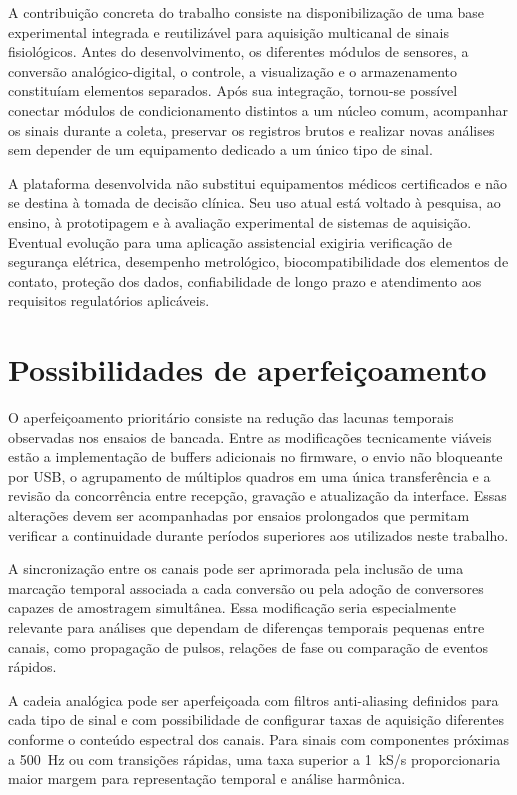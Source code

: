 \documentclass[a4paper,12pt]{fcte}
\begin{document}
A contribuição concreta do trabalho consiste na disponibilização de uma base experimental integrada e reutilizável para aquisição multicanal de sinais fisiológicos. Antes do desenvolvimento, os diferentes módulos de sensores, a conversão analógico-digital, o controle, a visualização e o armazenamento constituíam elementos separados. Após sua integração, tornou-se possível conectar módulos de condicionamento distintos a um núcleo comum, acompanhar os sinais durante a coleta, preservar os registros brutos e realizar novas análises sem depender de um equipamento dedicado a um único tipo de sinal.

A plataforma desenvolvida não substitui equipamentos médicos certificados e não se destina à tomada de decisão clínica. Seu uso atual está voltado à pesquisa, ao ensino, à prototipagem e à avaliação experimental de sistemas de aquisição. Eventual evolução para uma aplicação assistencial exigiria verificação de segurança elétrica, desempenho metrológico, biocompatibilidade dos elementos de contato, proteção dos dados, confiabilidade de longo prazo e atendimento aos requisitos regulatórios aplicáveis.

\section{Possibilidades de aperfeiçoamento}
\label{sec:possibilidades_aperfeicoamento}

O aperfeiçoamento prioritário consiste na redução das lacunas temporais observadas nos ensaios de bancada. Entre as modificações tecnicamente viáveis estão a implementação de buffers adicionais no firmware, o envio não bloqueante por USB, o agrupamento de múltiplos quadros em uma única transferência e a revisão da concorrência entre recepção, gravação e atualização da interface. Essas alterações devem ser acompanhadas por ensaios prolongados que permitam verificar a continuidade durante períodos superiores aos utilizados neste trabalho.

A sincronização entre os canais pode ser aprimorada pela inclusão de uma marcação temporal associada a cada conversão ou pela adoção de conversores capazes de amostragem simultânea. Essa modificação seria especialmente relevante para análises que dependam de diferenças temporais pequenas entre canais, como propagação de pulsos, relações de fase ou comparação de eventos rápidos.

A cadeia analógica pode ser aperfeiçoada com filtros anti-aliasing definidos para cada tipo de sinal e com possibilidade de configurar taxas de aquisição diferentes conforme o conteúdo espectral dos canais. Para sinais com componentes próximas a 500~Hz ou com transições rápidas, uma taxa superior a 1~kS/s proporcionaria maior margem para representação temporal e análise harmônica.
\end{document}
